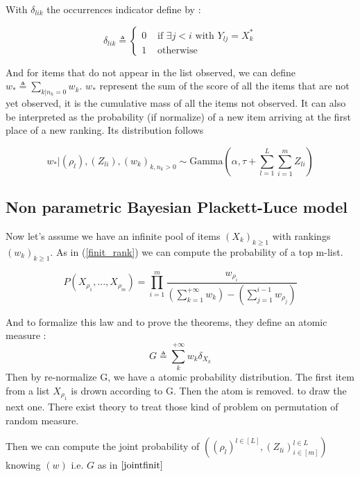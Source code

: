 \documentclass{article}
\begin{document}
With $\delta_{l i k}$ the occurrences indicator define by : 

\begin{equation}
\delta_{l i k}\triangleq\left\{\begin{array}{ll}
0 & \text { if } \exists j<i \text { with } Y_{l j}=X_{k}^{*} \\
1 & \text { otherwise }
\end{array}\right.
\label{delta}
\end{equation}

And for items that do not appear in the list observed, we can define $w_* \triangleq \sum_{k|n_k=0}w_k$. $w_*$ represent the sum of the score of all the items that are not yet observed, it is the cumulative mass of all the items not observed. It can also be interpreted as the probability (if normalize) of a new item arriving at the first place of a new ranking. Its distribution follows 

\begin{equation}
w_* \vert (\rho_l),(Z_{li}),(w_k)_{k,n_k>0} \sim \text{Gamma}\left(\alpha,\tau +\sum_{l=1}^L\sum_{i=1}^m Z_{li}\right)
\label{wrestfinit}
\end{equation}

\subsection{Non parametric Bayesian Plackett-Luce model}

Now let's assume we have an infinite pool of items $(X_k)_{k\ge 1}$ with rankings $(w_k)_{k\ge 1}$. As in (\ref{finit_rank}) we can compute the probability of a top m-list.

\begin{equation}
P(X_{\rho_1},...,X_{\rho_m}) = \prod_{i=1}^m\frac{w_{\rho_i}}{\left(\sum_{k=1}^{+\infty} w_k\right) -\left(\sum_{j=1}^{i-1}w_{\rho_j}\right)}
\label{infinit_rank}
\end{equation}

And to formalize this law and to prove the theorems, they define an atomic measure :
$$
G \triangleq \sum_k^{+\infty}w_k\delta_{X_k}
$$
Then by re-normalize G, we have a atomic probability distribution.
The first item from a list $X_{\rho_1}$ is drown according to G. Then the atom is removed. to draw the next one. There exist theory to treat those kind of problem on permutation of random measure. \cite{pitman2006combinatorial}

Then we can compute the joint probability of 
$((\rho_l)^{l\in [L]},(Z_{li})_{i \in [m] }^{l \in L} )$ knowing $(w)$ i.e. $G$ as in $\ref{jointfinit}$
\end{document}
